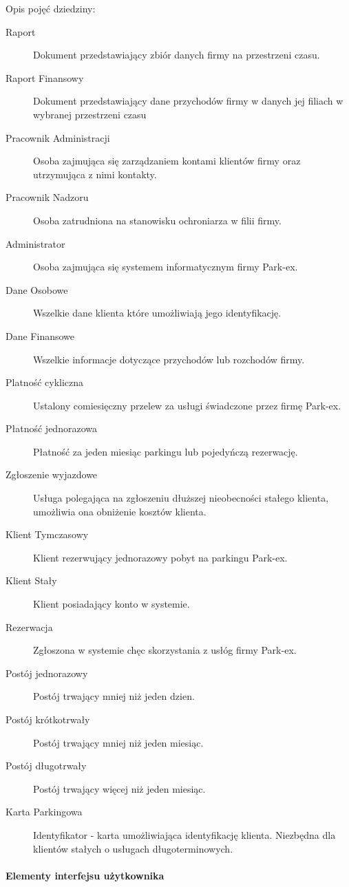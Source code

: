 \documentclass[paper=a4, fontsize=11pt]{scrartcl} %
\begin{document}
Opis pojęć dziedziny:


\begin{description}
  \item[Raport] Dokument przedstawiający zbiór danych firmy na przestrzeni czasu.
  \item[Raport Finansowy] Dokument przedstawiający dane przychodów firmy w danych jej filiach w wybranej przestrzeni czasu
  \item[Pracownik Administracji] Osoba zajmująca się zarządzaniem kontami klientów firmy oraz utrzymująca z nimi kontakty.
  \item[Pracownik Nadzoru] Osoba zatrudniona na stanowisku ochroniarza w filii firmy.
  \item[Administrator] Osoba zajmująca się systemem informatycznym firmy Park-ex.
  \item[Dane Osobowe] Wszelkie dane klienta które umożliwiają jego identyfikację.
  \item[Dane Finansowe] Wszelkie informacje dotyczące przychodów lub rozchodów firmy.
  \item[Platność cykliczna] Ustalony comiesięczny przelew za usługi świadczone przez firmę Park-ex.
  \item[Płatność jednorazowa] Płatność za jeden miesiąc parkingu lub pojedyńczą rezerwację.
  \item[Zgłoszenie wyjazdowe] Usługa polegająca na zgłoszeniu dłuższej nieobecności stałego klienta, umożliwia ona obniżenie kosztów klienta.
  \item[Klient Tymczasowy] Klient rezerwujący jednorazowy pobyt na parkingu Park-ex.
  \item[Klient Stały] Klient posiadający konto w systemie.
  \item[Rezerwacja] Zgłoszona w systemie chęc skorzystania z usłóg firmy Park-ex.
  \item[Postój jednorazowy] Postój trwający mniej niż jeden dzien.
  \item[Postój krótkotrwały]Postój trwający mniej niż jeden miesiąc.
  \item[Postój długotrwały] Postój trwający więcej niż jeden miesiąc.
  \item[Karta Parkingowa] Identyfikator - karta umożliwiająca identyfikację klienta. Niezbędna dla klientów stałych o usługach długoterminowych.
\end{description}

\paragraph{Elementy interfejsu użytkownika}
\end{document}
